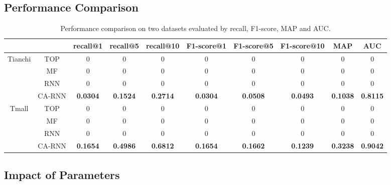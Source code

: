 \documentclass{sig-alternate}
\begin{document}
\subsection{Performance Comparison}
\begin{table}[htbp]
  \centering\scriptsize
  \caption{Performance comparison on two datasets evaluated by recall, F1-score, MAP and AUC.}
    \begin{tabular}{cccccccccc}
    \toprule
          &       & recall@1 & recall@5 & recall@10 & F1-score@1 & F1-score@5 & F1-score@10 & MAP   & AUC \\
    \midrule
    \multirow{4}[0]{*}{Tianchi} 
          & TOP   & 0  & 0  & 0  & 0  & 0  & 0  & 0  & 0  \\
          & MF    & 0  & 0  & 0  & 0  & 0  & 0  & 0  & 0  \\
          & RNN   & 0  & 0  & 0  & 0  & 0  & 0  & 0  & 0  \\
          & CA-RNN & \textbf{0.0304} & \textbf{0.1524} & \textbf{0.2714} & \textbf{0.0304} & \textbf{0.0508} & \textbf{0.0493} & \textbf{0.1038} & \textbf{0.8115} \\
    \midrule
    \multirow{4}[0]{*}{Tmall} 
          & TOP   & 0  & 0  & 0  & 0  & 0  & 0  & 0  & 0  \\
          & MF    & 0  & 0  & 0  & 0  & 0  & 0  & 0  & 0  \\
          & RNN   & 0  & 0  & 0  & 0  & 0  & 0  & 0  & 0  \\
          & CA-RNN & \textbf{0.1654} & \textbf{0.4986} & \textbf{0.6812} & \textbf{0.1654} & \textbf{0.1662} & \textbf{0.1239} & \textbf{0.3238} & \textbf{0.9042} \\
    \bottomrule
    \end{tabular}%
  \label{tab:result}%
\end{table}%


\subsection{Impact of Parameters}









\end{document}
